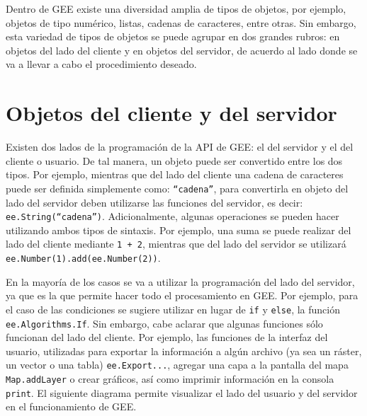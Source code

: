 \documentclass[
  12pt,
  letterpaper,
  twoside]{book}
\begin{document}
Dentro de GEE existe una diversidad amplia de tipos de objetos, por ejemplo, objetos de tipo numérico, listas, cadenas de caracteres, entre otras. Sin embargo, esta variedad de tipos de objetos se puede agrupar en dos grandes rubros: en objetos del lado del cliente y en objetos del servidor, de acuerdo al lado donde se va a llevar a cabo el procedimiento deseado.

\hypertarget{objetos-del-cliente-y-del-servidor}{%
\section{Objetos del cliente y del servidor}\label{objetos-del-cliente-y-del-servidor}}

Existen dos lados de la programación de la API de GEE: el del servidor y el del cliente o usuario. De tal manera, un objeto puede ser convertido entre los dos tipos. Por ejemplo, mientras que del lado del cliente una cadena de caracteres puede ser definida simplemente como: \texttt{“cadena”}, para convertirla en objeto del lado del servidor deben utilizarse las funciones del servidor, es decir: \texttt{ee.String(“cadena”)}. Adicionalmente, algunas operaciones se pueden hacer utilizando ambos tipos de sintaxis. Por ejemplo, una suma se puede realizar del lado del cliente mediante \texttt{1\ +\ 2}, mientras que del lado del servidor se utilizará \texttt{ee.Number(1).add(ee.Number(2))}.

En la mayoría de los casos se va a utilizar la programación del lado del servidor, ya que es la que permite hacer todo el procesamiento en GEE. Por ejemplo, para el caso de las condiciones se sugiere utilizar en lugar de \texttt{if} y \texttt{else}, la función \texttt{ee.Algorithms.If}. Sin embargo, cabe aclarar que algunas funciones sólo funcionan del lado del cliente. Por ejemplo, las funciones de la interfaz del usuario, utilizadas para exportar la información a algún archivo (ya sea un ráster, un vector o una tabla) \texttt{ee.Export...}, agregar una capa a la pantalla del mapa \texttt{Map.addLayer} o crear gráficos, así como imprimir información en la consola \texttt{print}. El siguiente diagrama permite visualizar el lado del usuario y del servidor en el funcionamiento de GEE.
\end{document}
